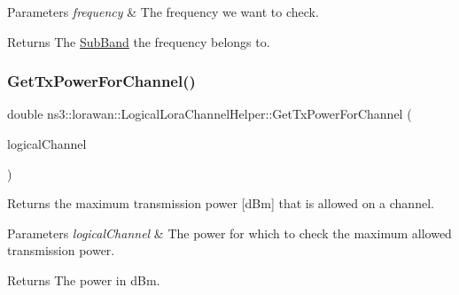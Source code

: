 \begin{DoxyParams}{Parameters}
{\em frequency} & The frequency we want to check. \\
\hline
\end{DoxyParams}
\begin{DoxyReturn}{Returns}
The \hyperlink{classns3_1_1lorawan_1_1SubBand}{Sub\+Band} the frequency belongs to. 
\end{DoxyReturn}
\mbox{\label{classns3_1_1lorawan_1_1LogicalLoraChannelHelper_a17e3eb7c0412eb5a859082c549e8f1f9}} 
\subsubsection{\texorpdfstring{Get\+Tx\+Power\+For\+Channel()}{GetTxPowerForChannel()}}
{\footnotesize\ttfamily double ns3\+::lorawan\+::\+Logical\+Lora\+Channel\+Helper\+::\+Get\+Tx\+Power\+For\+Channel (\begin{DoxyParamCaption}\item[{Ptr$<$ \hyperlink{classns3_1_1lorawan_1_1LogicalLoraChannel}{Logical\+Lora\+Channel} $>$}]{logical\+Channel }\end{DoxyParamCaption})}

Returns the maximum transmission power \mbox{[}d\+Bm\mbox{]} that is allowed on a channel.


\begin{DoxyParams}{Parameters}
{\em logical\+Channel} & The power for which to check the maximum allowed transmission power. \\
\hline
\end{DoxyParams}
\begin{DoxyReturn}{Returns}
The power in d\+Bm. 
\end{DoxyReturn}
\mbox{\label{classns3_1_1lorawan_1_1LogicalLoraChannelHelper_ae4467bd31813cf74dcac7f4990f5aa15}} 
